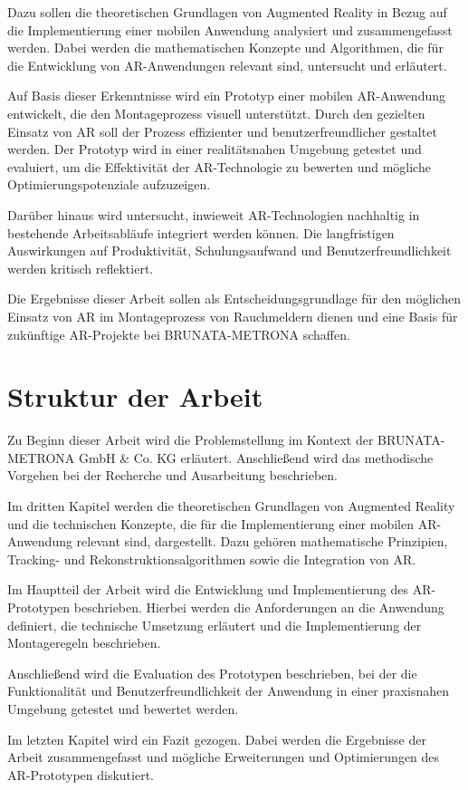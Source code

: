 Dazu sollen die theoretischen Grundlagen von Augmented Reality in Bezug auf die Implementierung einer mobilen Anwendung analysiert und zusammengefasst werden. Dabei werden die mathematischen Konzepte und Algorithmen, die für die Entwicklung von AR-Anwendungen relevant sind, untersucht und erläutert.

Auf Basis dieser Erkenntnisse wird ein Prototyp einer mobilen AR-Anwendung entwickelt, die den Montageprozess visuell unterstützt. Durch den gezielten Einsatz von AR soll der Prozess effizienter und benutzerfreundlicher gestaltet werden. Der Prototyp wird in einer realitätsnahen Umgebung getestet und evaluiert, um die Effektivität der AR-Technologie zu bewerten und mögliche Optimierungspotenziale aufzuzeigen.

Darüber hinaus wird untersucht, inwieweit AR-Technologien nachhaltig in bestehende Arbeitsabläufe integriert werden können. Die langfristigen Auswirkungen auf Produktivität, Schulungsaufwand und Benutzerfreundlichkeit werden kritisch reflektiert.

Die Ergebnisse dieser Arbeit sollen als Entscheidungsgrundlage für den möglichen Einsatz von AR im Montageprozess von Rauchmeldern dienen und eine Basis für zukünftige AR-Projekte bei BRUNATA-METRONA schaffen.

\section{Struktur der Arbeit}

Zu Beginn dieser Arbeit wird die Problemstellung im Kontext der BRUNATA-METRONA GmbH \& Co. KG erläutert. Anschließend wird das methodische Vorgehen bei der Recherche und Ausarbeitung beschrieben. 

Im dritten Kapitel werden die theoretischen Grundlagen von Augmented Reality und die technischen Konzepte, die für die Implementierung einer mobilen AR-Anwendung relevant sind, dargestellt. Dazu gehören mathematische Prinzipien, Tracking- und Rekonstruktionsalgorithmen sowie die Integration von AR.

Im Hauptteil der Arbeit wird die Entwicklung und Implementierung des AR-Prototypen beschrieben. Hierbei werden die Anforderungen an die Anwendung definiert, die technische Umsetzung erläutert und die Implementierung der Montageregeln beschrieben. 

Anschließend wird die Evaluation des Prototypen beschrieben, bei der die Funktionalität und Benutzerfreundlichkeit der Anwendung in einer praxisnahen Umgebung getestet und bewertet werden.

Im letzten Kapitel wird ein Fazit gezogen. Dabei werden die Ergebnisse der Arbeit zusammengefasst und mögliche Erweiterungen und Optimierungen des AR-Prototypen diskutiert.

